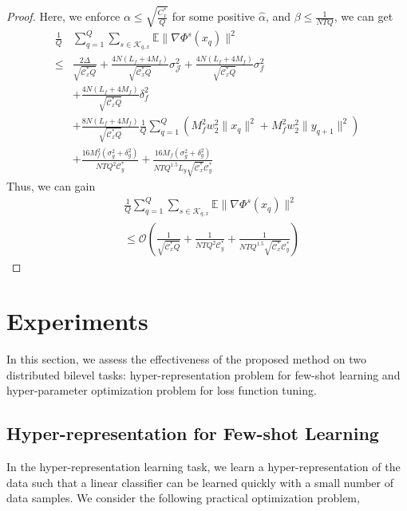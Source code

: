 \documentclass[lettersize,journal]{IEEEtran}
\begin{document}
\begin{proof}
Here, we enforce $\alpha\leq \sqrt{\frac{C_x^*}{Q}}$ for some positive $\hat{\alpha}$, and $\beta \leq \frac{1}{NTQ}$, we can get
\begin{align*}
     \frac{1}{Q}&\sum_{q=1}^Q\sum_{s\in \mathcal{K}_{q,x}}\mathbb{E}\|\nabla \Phi^s(x_{q})\|^2\\\leq& \frac{2\Delta}{\sqrt{\mathcal{C}_x^*Q}}+\frac{4N(L_f+4M_f)}{\sqrt{\mathcal{C}_x^*Q}}\sigma_{\mathcal{J}}^2+\frac{4N(L_f+4M_f)}{\sqrt{\mathcal{C}_x^*Q}}\sigma_f^2\\&+\frac{4N(L_f+4M_f)}{\sqrt{\mathcal{C}_x^*Q}}\delta^2_f\\&+\frac{8N(L_f+4M_f)}{\sqrt{\mathcal{C}_x^*Q}}\frac{1}{Q}\sum_{q=1}^Q(M_f^2 w_2^2\|x_q\|^2+M_f^2 w_2^2 \|y_{q+1}\|^2)\\
     &+\frac{16M_f^2(\sigma_{g}^2+\delta_{g}^2)}{NTQ^2\mathcal{C}^{*}_{y}}+\frac{16M_f(\sigma_{g}^2+\delta_{g}^2)}{NTQ^{1.5}L_y\sqrt{\mathcal{C}_x^*}\mathcal{C}^{*}_{y}}
\end{align*}
Thus, we can gain 
\begin{align*}
    &\frac{1}{Q}\sum_{q=1}^Q\sum_{s\in \mathcal{K}_{q,x}}\mathbb{E}\|\nabla \Phi^s(x_{q})\|^2\\&\leq \mathcal{O}(\frac{1}{\sqrt{\mathcal{C}_x^*Q}}+\frac{1}{NTQ^2\mathcal{C}^{*}_{y}}+\frac{1}{NTQ^{1.5}\sqrt{\mathcal{C}_x^*}\mathcal{C}^{*}_{y}})
\end{align*}
\end{proof}



\section{Experiments}\label{sec:exp}
In this section, we assess the effectiveness of the proposed method on two distributed bilevel tasks: hyper-representation problem for few-shot learning and hyper-parameter optimization problem for loss function tuning.

\subsection{Hyper-representation for Few-shot Learning}\label{sec:few-shot}
In the hyper-representation learning task, we learn a hyper-representation of the data such that a linear classifier can be learned quickly with a small number of data samples.
We consider the following practical optimization problem,

\begin{center}
\end{center}
\end{document}

